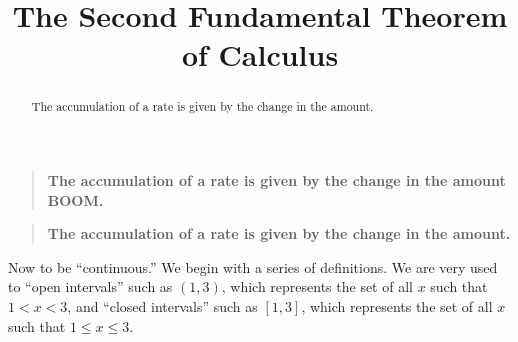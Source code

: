 \documentclass{ximera}
\title[Dig-In:]{The Second Fundamental Theorem of Calculus}
\begin{document}
\begin{abstract}
The accumulation of a rate is given by the change in the amount.
\end{abstract}
\maketitle

\begin{quote}\large\textbf{The \textcolor{green!70!black!70!blue}{accumulation} of a \textcolor{blue!70!green}{rate} is given by the \textcolor{purple!50!blue!90!black}{change in the amount BOOM}.}
\end{quote}
% 
\begin{quote}\large\textbf{The accumulation of a rate is given by the change in the amount.}
\end{quote}

Now to be ``continuous.'' We begin with a series of definitions. We are
very used to ``open intervals'' such as $(1,3)$, which represents the set
of all $x$ such that $1<x<3$, and ``closed intervals'' such as
$[1,3]$, which represents the set of all $x$ such that $1\leq x\leq
3$. 
\end{document}
